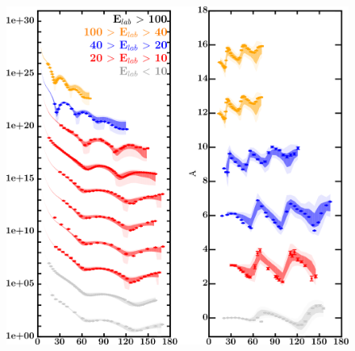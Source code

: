\documentclass[twocolumn,secnumarabic,amssymb, nobibnotes, aps, prl,
superscriptaddress, nobalancelastpage, draft]{revtex4}
\begin{document}
\begin{figure}[!htb]
    \centering
    \begin{minipage}{0.4\linewidth}
        \centering
        \includegraphics[width=\linewidth]{figures/ni64_protonElastic.png}
        \label{DOM_ni64_proton_elastic}
    \end{minipage}\hspace{6pt}
    \begin{minipage}{0.4\linewidth}
        \centering

\end{minipage}
\end{figure}
\end{document}
